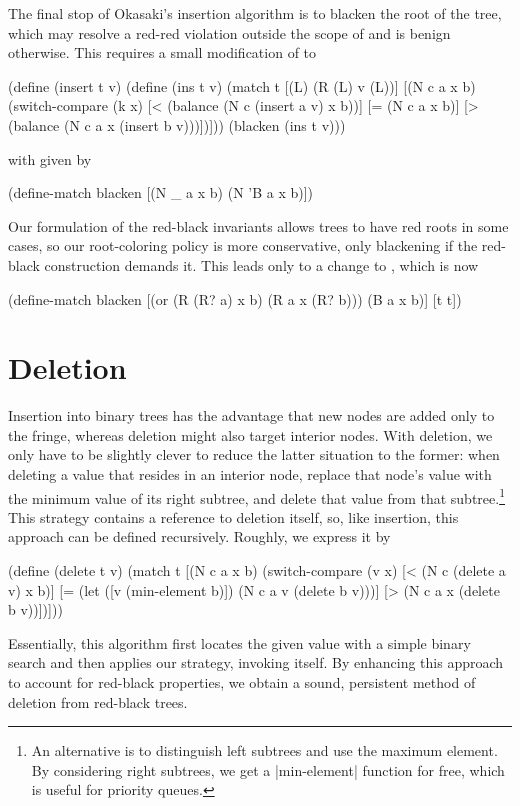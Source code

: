\documentclass[preprint]{sigplanconf}
\begin{document}
The final stop of Okasaki's insertion algorithm is to blacken the root of the
tree, which may resolve a red-red violation outside the scope of
 and is benign otherwise. This requires a small modification of
 to 
\begin{schemedisplay}
(define (insert t v)
  (define (ins t v)
    (match t
      [(L) (R (L) v (L))]
      [(N c a x b)
       (switch-compare
         (k x)
         [< (balance (N c (insert a v) x b))]
         [= (N c a x b)]
         [> (balance (N c a x (insert b v)))])]))
  (blacken (ins t v)))
\end{schemedisplay}
with  given by
\begin{schemedisplay}
(define-match blacken
  [(N _ a x b) (N 'B a x b)])
\end{schemedisplay}
Our formulation of the red-black invariants allows trees to have red roots in
some cases, so our root-coloring policy is more conservative, only blackening if
the red-black construction demands it. This leads only to a change to
, which is now
\begin{schemedisplay}
(define-match blacken
  [(or (R (R? a) x b)
       (R a x (R? b)))
   (B a x b)]
  [t t])
\end{schemedisplay}

\section{Deletion}

Insertion into binary trees has the advantage that new nodes are added only to
the fringe, whereas deletion might also target interior nodes. With deletion, we
only have to be slightly clever to reduce the latter situation to the former:
when deleting a value that resides in an interior node, replace that node's
value with the minimum value of its right subtree, and delete that value from
that subtree.\footnote{An alternative is to distinguish left subtrees and use
the maximum element. By considering right subtrees, we get a
\scheme|min-element| function for free, which is useful for priority queues.}
This strategy contains a reference to deletion itself, so, like insertion, this
approach can be defined recursively. Roughly, we express it by
\begin{schemedisplay}
(define (delete t v)
  (match t
    [(N c a x b)
     (switch-compare
       (v x)
       [< (N c (delete a v) x b)]
       [= (let ([v (min-element b)])
            (N c a v (delete b v)))]
       [> (N c a x (delete b v))])]))
\end{schemedisplay}
Essentially, this algorithm first locates the given value with a simple binary
search and then applies our strategy, invoking itself. By enhancing this
approach to account for red-black properties, we obtain a sound, persistent
method of deletion from red-black trees.
\end{document}
